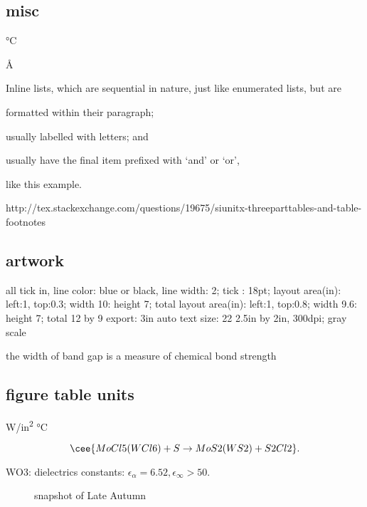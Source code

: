 \subsection{misc}

\si{\degreeCelsius}

\si{\angstrom}

Inline lists, which are sequential in nature, just like enumerated lists, but are
\begin{enumerate*}[label=\itshape\alph*\upshape)]
\item formatted within their paragraph;
\item usually labelled with letters; and
\item usually have the final item prefixed with `and' or `or',
\end{enumerate*} like this example.

http://tex.stackexchange.com/questions/19675/siunitx-threeparttables-and-table-footnotes


\subsection{artwork}

 all tick in, line color: blue or black, line width: 2; tick : 18pt;
 layout area(in): left:1, top:0.3; width 10: height 7; total
 layout area(in): left:1, top:0.8; width 9.6: height 7; total 12 by 9
 export: 3in auto
 text size: 22
2.5in by 2in, 300dpi; gray scale

the width of band gap is a measure of chemical bond strength

\subsection{figure table units}
\si{W/in^2}
\si{\degreeCelsius}

\begin{equation}\label{eq:mclns}
\cee{MoCl5(WCl6) + S \rightarrow MoS2(WS2) + S2Cl2}.
\end{equation}

 WO3: dielectrics constants: $\epsilon_\alpha = 6.52,\epsilon_\infty > 50$. \cite{Deb2008}
\begin{figure}[htb]
\centering
{}\hspace{0.04\textwidth}

\caption{snapshot of Late Autumn}
\label{fig:tw}
\end{figure}

